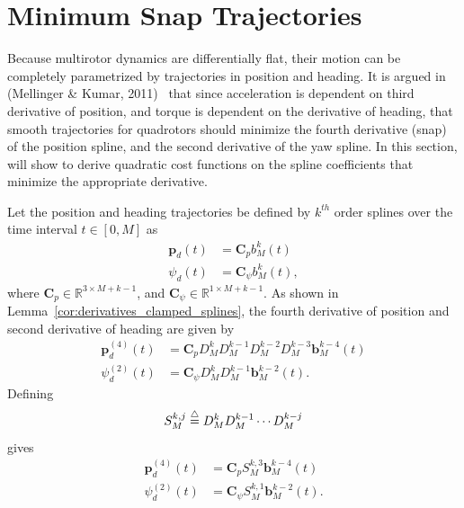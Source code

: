 \section{Minimum Snap Trajectories}

Because multirotor dynamics are differentially flat, their motion can be completely parametrized by trajectories in position and heading.  It is argued in (Mellinger \& Kumar, 2011)~\cite{MellingerKumar11} that since acceleration is dependent on third derivative of position, and torque is dependent on the derivative of heading, that smooth trajectories for quadrotors should minimize the fourth derivative (snap) of the position spline, and the second derivative of the yaw spline.  In this section, will show to derive quadratic cost functions on the spline coefficients that minimize the appropriate derivative.  

Let the position and heading trajectories be defined by $k^{th}$ order splines over the time interval $t\in[0,M]$ as
\begin{align*}
	\mathbf{p}_d(t) &= \mathbf{C}_p b_M^k(t) \\	
	\psi_d(t) &= \mathbf{C}_{\psi} b_M^k(t),
\end{align*}
where $\mathbf{C}_p \in \mathbb{R}^{3\times M+k-1}$, and $\mathbf{C}_{\psi} \in \mathbb{R}^{1\times M+k-1}$.
As shown in Lemma~\ref{cor:derivatives_clamped_splines}, the fourth derivative of position and second derivative of heading are given by
\begin{align*}
	\mathbf{p}^{(4)}_d(t) &= \mathbf{C}_p D_M^k D_M^{k-1} D_M^{k-2} D_M^{k-3}	\mathbf{b}_M^{k-4}(t) \\
	\psi^{(2)}_d(t) &= \mathbf{C}_{\psi} D_M^k D_M^{k-1} \mathbf{b}_M^{k-2}(t).
\end{align*}
Defining
\[
S_M^{k,j} \stackrel{\triangle}{=} D_M^k D_M^{k-1}\cdots D_M^{k-j}
\]
gives
\begin{align*}
	\mathbf{p}^{(4)}_d(t) &= \mathbf{C}_p S_M^{k,3} 	\mathbf{b}_M^{k-4}(t) \\
	\psi^{(2)}_d(t) &= \mathbf{C}_{\psi} S_M^{k,1} \mathbf{b}_M^{k-2}(t).
\end{align*}

